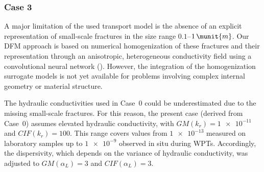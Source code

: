     


\FloatBarrier
\subsubsection{Case 3}

A major limitation of the used transport model is the absence of an explicit representation of small-scale fractures in the size range $0.1$--$1\,\munit{m}$. 
Our \gls{DFM} approach is based on numerical homogenization of these fractures and their representation through an anisotropic, heterogeneous conductivity field using a convolutional neural network (\cite{Spetlik_Convolutional_2026}). However, the integration of the homogenization surrogate models is not yet available for problems involving complex internal geometry or material structure. 

The hydraulic conductivities used in Case~0 could be underestimated due to the missing small-scale fractures. For this reason, the present case (derived from Case~0) assumes elevated hydraulic conductivity, with $GM(k_r)=\num{1e-11}$ and $CIF(k_r)=100$. This range covers values from $\num{1e-13}$ measured on laboratory samples up to $\num{1e-9}$ observed in situ during \gls{WPT}s. Accordingly, the dispersivity, which depends on the variance of hydraulic conductivity, was adjusted to $GM(\alpha_L)=3$ and $CIF(\alpha_L)=3$.


